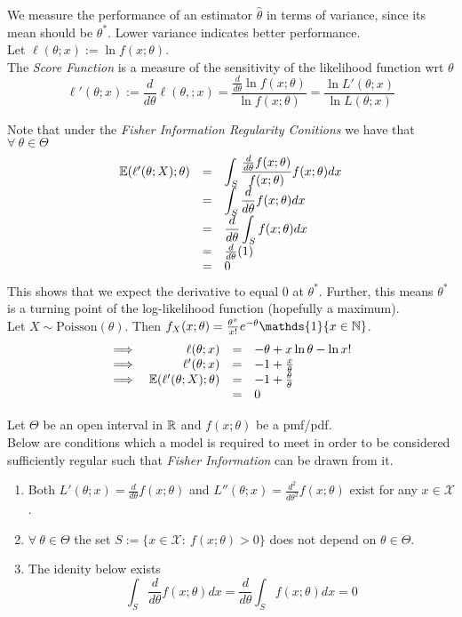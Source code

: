 \documentclass[11pt,a4paper]{article}
\begin{document}
We measure the performance of an estimator $\hat{\theta}$ in terms of variance, since its mean should be $\theta^*$. Lower variance indicates better performance.\\

Let $\ell(\theta;x):=\ln f(x;\theta)$.\\
The \textit{Score Function} is a measure of the sensitivity of the likelihood function wrt $\theta$
$$\ell'(\theta;x):=\frac{d}{d\theta}\ell(\theta,;x)=\frac{\frac{d}{d\theta}\ln f(x;\theta)}{\ln f(x;\theta)}=\frac{\ln L'(\theta;x)}{\ln L(\theta;x)}$$

Note that under the \textit{Fisher Information Regularity Conitions} we have that $\forall\ \theta\in\Theta$
\[\begin{array}{rcl}
\mathbb{E}(\ell'(\theta;X);\theta)&=&{\displaystyle\int_S\dfrac{\frac{d}{d\theta}f(x;\theta)}{f(x;\theta)}f(x;\theta)dx}\\
&=&{\displaystyle\int_S\frac{d}{d\theta}f(x;\theta)dx}\\
&=&{\displaystyle\frac{d}{d\theta}\int_Sf(x;\theta)dx}\\
&=&\frac{d}{d\theta}(1)\\
&=&0
\end{array}\]
This shows that we expect the derivative to equal $0$ at $\theta^*$. Further, this means $\theta^*$ is a turning point of the log-likelihood function (hopefully a maximum).\\

Let $X\sim\text{Poisson}(\theta)$. Then $f_X(x;\theta)=\frac{\theta^x}{x!}e^{-\theta}\mathds{1}\{x\in\nats\}$.
\[\begin{array}{rrcl}
\implies&\ell(\theta;x)&=&-\theta+x\ln\theta-\ln x!\\
\implies&\ell'(\theta;x)&=&-1+\frac{x}{\theta}\\
\implies&\mathbb{E}(\ell'(\theta;X);\theta)&=&-1+\frac{\theta}{\theta}\\
&&=&0
\end{array}\]

Let $\Theta$ be an open interval in $\mathbb{R}$ and $f(x;\theta)$ be a pmf/pdf.\\
Below are conditions which a model is required to meet in order to be considered sufficiently regular such that \textit{Fisher Information} can be drawn from it.
\begin{enumerate}[label=\roman*)]
	\item Both $L'(\theta;x)=\frac{d}{d\theta}f(x;\theta)$ and $L''(\theta;x)=\frac{d^2}{d\theta^2}f(x;\theta)$ exist for any $x\in\mathcal{X}$.
	\item $\forall\ \theta\in\Theta$ the set $S:=\{x\in\mathcal{X}:\ f(x;\theta)>0\}$ does not depend on $\theta\in\Theta$.
	\item The idenity below exists
	$$\int_S\frac{d}{d\theta}f(x;\theta)dx=\frac{d}{d\theta}\int_Sf(x;\theta)dx=0$$
\end{enumerate}
\end{document}
